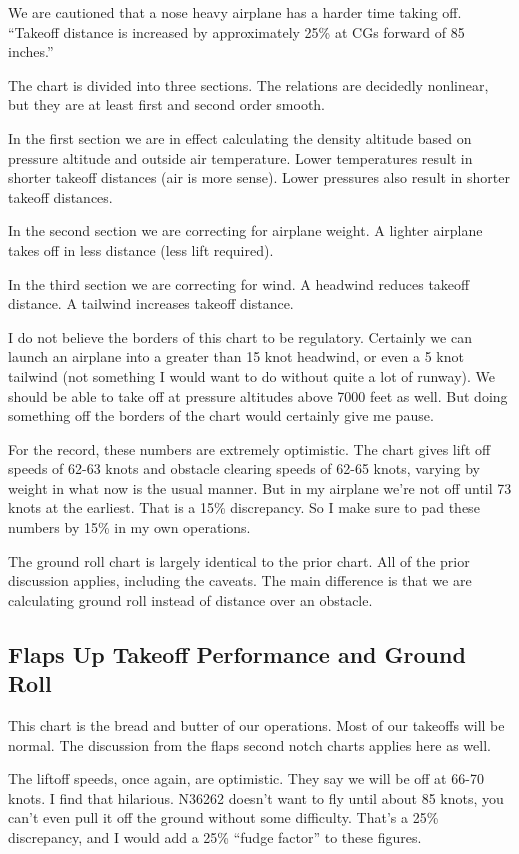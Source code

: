 We are cautioned that a nose heavy airplane has a harder time taking off. ``Takeoff distance is increased by approximately 25\% at CGs forward of 85 inches.'' 

The chart is divided into three sections. The relations are decidedly nonlinear, but they are at least first and second order smooth.

In the first section we are in effect calculating the density altitude based on pressure altitude and outside air temperature. Lower temperatures result in shorter takeoff distances (air is more sense). Lower pressures also result in shorter takeoff distances.

In the second section we are correcting for airplane weight. A lighter airplane takes off in less distance (less lift required).

In the third section we are correcting for wind. A headwind reduces takeoff distance. A tailwind increases takeoff distance.

I do not believe the borders of this chart to be regulatory. Certainly we can launch an airplane into a greater than 15 knot headwind, or even a 5 knot tailwind (not something I would want to do without quite a lot of runway). We should be able to take off at pressure altitudes above 7000 feet as well. But doing something off the borders of the chart would certainly give me pause.

For the record, these numbers are extremely optimistic. The chart gives lift off speeds of 62-63 knots and obstacle clearing speeds of 62-65 knots, varying by weight in what now is the usual manner. But in my airplane we're not off until 73 knots at the earliest. That is a 15\% discrepancy. So I make sure to pad these numbers by 15\% in my own operations.

The ground roll chart is largely identical to the prior chart. All of the prior discussion applies, including the caveats. The main difference is that we are calculating ground roll instead of distance over an obstacle.

\subsection{Flaps Up Takeoff Performance and Ground Roll}

This chart is the bread and butter of our operations. Most of our takeoffs will be normal. The discussion from the flaps second notch charts applies here as well.

The liftoff speeds, once again, are optimistic. They say we will be off at 66-70 knots. I find that hilarious. N36262 doesn't want to fly until about 85 knots, you can't even pull it off the ground without some difficulty. That's a 25\% discrepancy, and I would add a 25\% ``fudge factor'' to these figures.

